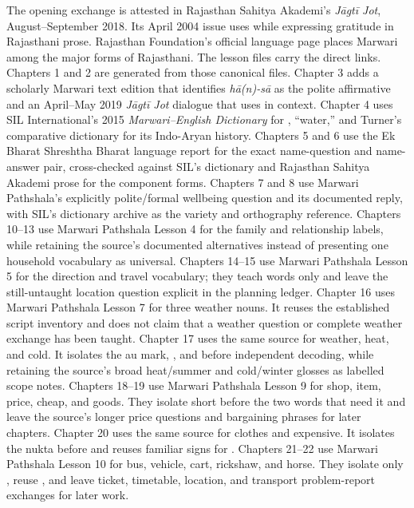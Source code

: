 \documentclass[11pt,twoside]{book}
\begin{document}
The opening exchange is attested in Rajasthan Sahitya Akademi's \emph{Jāgtī
Jot}, August--September 2018. Its April 2004 issue uses  while
expressing gratitude in Rajasthani prose. Rajasthan Foundation's official
language page places Marwari among the major forms of Rajasthani. The lesson
files carry the direct links. Chapters 1 and 2 are generated from those
canonical files. Chapter 3 adds a scholarly Marwari text edition that identifies
\emph{hā(n)-sā} as the polite affirmative and an April--May 2019 \emph{Jāgtī Jot}
dialogue that uses  in context. Chapter 4 uses SIL International's
2015 \emph{Marwari--English Dictionary} for , ``water,'' and Turner's
comparative dictionary for its Indo-Aryan history.
Chapters 5 and 6 use the Ek Bharat Shreshtha Bharat language report for the exact
name-question and name-answer pair, cross-checked against SIL's dictionary and
Rajasthan Sahitya Akademi prose for the component forms.
Chapters 7 and 8 use Marwari Pathshala's explicitly polite/formal wellbeing
question and its documented reply, with SIL's dictionary archive as the variety
and orthography reference.
Chapters 10--13 use Marwari Pathshala Lesson 4 for the family and relationship
labels, while retaining the source's documented alternatives instead of
presenting one household vocabulary as universal.
Chapters 14--15 use Marwari Pathshala Lesson 5 for the direction and travel
vocabulary; they teach words only and leave the still-untaught location question
explicit in the planning ledger.
Chapter 16 uses Marwari Pathshala Lesson 7 for three weather nouns. It reuses
the established script inventory and does not claim that a weather question or
complete weather exchange has been taught.
Chapter 17 uses the same source for weather, heat, and cold. It isolates the au
mark, , and  before independent decoding, while retaining the
source's broad heat/summer and cold/winter glosses as labelled scope notes.
Chapters 18--19 use Marwari Pathshala Lesson 9 for shop, item, price, cheap,
and goods. They isolate short  before the two words that need it and leave
the source's longer price questions and bargaining phrases for later chapters.
Chapter 20 uses the same source for clothes and expensive. It isolates the
nukta before  and reuses familiar signs for .
Chapters 21--22 use Marwari Pathshala Lesson 10 for bus, vehicle, cart,
rickshaw, and horse. They isolate only , reuse , and leave ticket,
timetable, location, and transport problem-report exchanges for later work.


\end{document}
